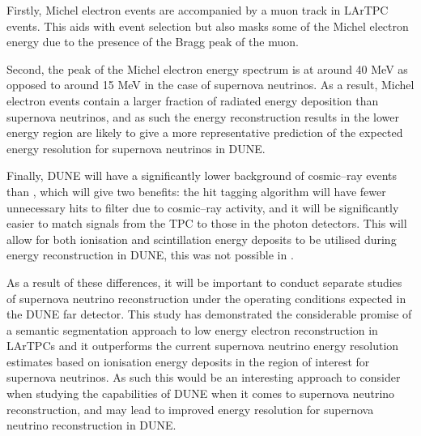 Firstly, Michel electron events are accompanied by a muon track in LArTPC 
events. This aids with event selection but also masks some of the Michel 
electron energy due to the presence of the Bragg peak of the muon. 

Second, the peak of the Michel electron energy spectrum is at around 40 MeV as 
opposed to around 15 MeV in the case of supernova neutrinos. As a result, 
Michel electron events contain a larger fraction of radiated energy deposition 
than supernova neutrinos, and as such the energy reconstruction results in the 
lower energy region are likely to give a more representative prediction of the 
expected energy resolution for supernova neutrinos in DUNE. 

Finally, DUNE will have a significantly lower background of cosmic--ray events 
than \protodune{}, which will give two benefits: the hit tagging algorithm 
will have fewer unnecessary hits to filter due to cosmic--ray activity, and it 
will be significantly easier to match signals from the TPC to those in the 
photon detectors. This will allow for both ionisation and scintillation energy 
deposits to be utilised during energy reconstruction in DUNE, this was not 
possible in \protodune{}.

As a result of these differences, it will be important to conduct separate
studies of supernova neutrino reconstruction under the operating conditions
expected in the DUNE far detector. This study has demonstrated the considerable
promise of a semantic segmentation approach to low energy electron
reconstruction in LArTPCs and it outperforms the current supernova neutrino 
energy resolution estimates based on ionisation energy deposits in the region of
interest for supernova neutrinos. As such this would be an interesting 
approach to consider when studying the capabilities of DUNE when it comes to 
supernova neutrino reconstruction, and may lead to improved energy resolution 
for supernova neutrino reconstruction in DUNE.
